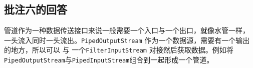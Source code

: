 
\subsection{批注六的回答}
\label{sec:fix:bl6}

管道作为一种数据传送接口来说一般需要一个入口与一个出口，就像水管一样， 一头流入同时一头流出。\lstinline|PipedOutputStream| 作为一个数据源，需要有一个输出的地方，所以可以
与 一个\lstinline|FilterInputStream| 对接然后获取数据。例如将\lstinline|PipedOutputStream|与\lstinline|PipedInputStream|组合到一起形成一个管道。
